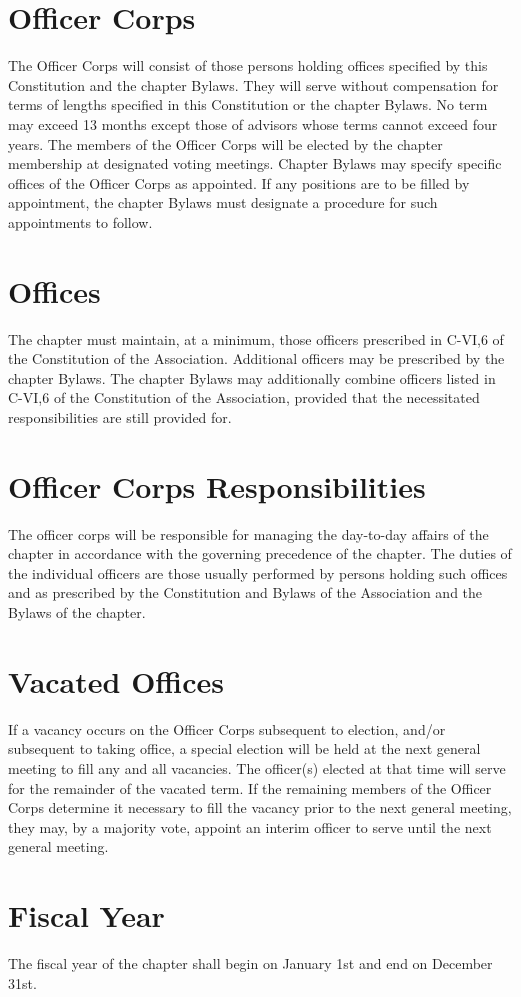 \section{Officer Corps}
The Officer Corps will consist of those persons holding offices specified by this Constitution and the chapter Bylaws. They will serve without compensation for terms of lengths specified in this Constitution or the chapter Bylaws. No term may exceed 13 months except those of advisors whose terms cannot exceed four years. The members of the Officer Corps will be elected by the chapter membership at designated voting meetings. Chapter Bylaws may specify specific offices of the Officer Corps as appointed. If any positions are to be filled by appointment, the chapter Bylaws must designate a procedure for such appointments to follow.

\section{Offices} The chapter must maintain, at a minimum, those officers prescribed in C-VI,6 of the Constitution of the Association. Additional officers may be prescribed by the chapter Bylaws. The chapter Bylaws may additionally combine officers listed in C-VI,6 of the Constitution of the Association, provided that the necessitated responsibilities are still provided for.

\section{Officer Corps Responsibilities} The officer corps will be responsible for managing the day-to-day affairs of the chapter in accordance with the governing precedence of the chapter.  The duties of the individual officers are those usually performed by persons holding such offices and as prescribed by the Constitution and Bylaws of the Association and the Bylaws of the chapter.

\section{Vacated Offices} If a vacancy occurs on the Officer Corps subsequent to election, and/or subsequent to taking office, a special election will be held at the next general meeting to fill any and all vacancies. The officer(s) elected at that time will serve for the remainder of the vacated term. If the remaining members of the Officer Corps determine it necessary to fill the vacancy prior to the next general meeting, they may, by a majority vote, appoint an interim officer to serve until the next general meeting.

\section{Fiscal Year} The fiscal year of the chapter shall begin on January 1st and end on December 31st.



